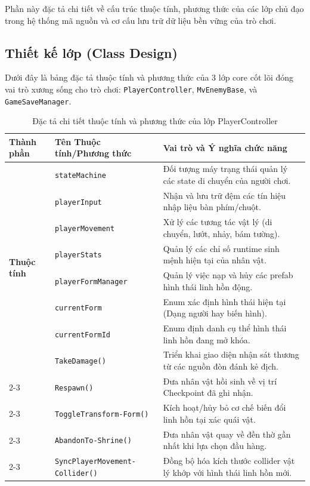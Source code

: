 \documentclass[../DoAn.tex]{subfiles}
\begin{document}
Phần này đặc tả chi tiết về cấu trúc thuộc tính, phương thức của các lớp chủ đạo trong hệ thống mã nguồn và cơ cấu lưu trữ dữ liệu bền vững của trò chơi.

\subsection{Thiết kế lớp (Class Design)}
Dưới đây là bảng đặc tả thuộc tính và phương thức của 3 lớp core cốt lõi đóng vai trò xương sống cho trò chơi: \texttt{PlayerController}, \texttt{MvEnemyBase}, và \texttt{GameSaveManager}.

\begin{table}[H]
\centering
\begin{tabular}{|p{2.2cm}|p{4.8cm}|p{8.0cm}|}
\hline
\textbf{Thành phần} & \textbf{Tên Thuộc tính/Phương thức} & \textbf{Vai trò và Ý nghĩa chức năng} \\ \hline
\multirow{8}{*}{\textbf{Thuộc tính}} & \texttt{stateMachine} & Đối tượng máy trạng thái quản lý các state di chuyển của người chơi. \\ \cline{2-3}
 & \texttt{playerInput} & Nhận và lưu trữ đệm các tín hiệu nhập liệu bàn phím/chuột. \\ \cline{2-3}
 & \texttt{playerMovement} & Xử lý các tương tác vật lý (di chuyển, lướt, nhảy, bám tường). \\ \cline{2-3}
 & \texttt{playerStats} & Quản lý các chỉ số runtime sinh mệnh hiện tại của nhân vật. \\ \cline{2-3}
 & \texttt{playerFormManager} & Quản lý việc nạp và hủy các prefab hình thái linh hồn động. \\ \cline{2-3}
 & \texttt{currentForm} & Enum xác định hình thái hiện tại (Dạng người hay biến hình). \\ \cline{2-3}
 & \texttt{currentFormId} & Enum định danh cụ thể hình thái linh hồn đang mở khóa. \\ \hline
\multirow{5}{*}{\textbf{Phương thức}} & \texttt{TakeDamage()} & Triển khai giao diện nhận sát thương từ các nguồn đòn đánh kẻ địch. \\ \cline{2-3}
 & \texttt{Respawn()} & Đưa nhân vật hồi sinh về vị trí Checkpoint đã ghi nhận. \\ \cline{2-3}
 & \texttt{ToggleTransform-}\newline\texttt{Form()} & Kích hoạt/hủy bỏ cơ chế biến đổi linh hồn tại xác quái vật. \\ \cline{2-3}
 & \texttt{AbandonTo-}\newline\texttt{Shrine()} & Đưa nhân vật quay về đền thờ gần nhất khi lựa chọn đầu hàng. \\ \cline{2-3}
 & \texttt{SyncPlayerMovement-}\newline\texttt{Collider()} & Đồng bộ hóa kích thước collider vật lý khớp với hình thái linh hồn mới. \\ \hline
\end{tabular}
\caption{Đặc tả chi tiết thuộc tính và phương thức của lớp PlayerController}
\label{table:player_controller_details}
\end{table}
\end{document}

